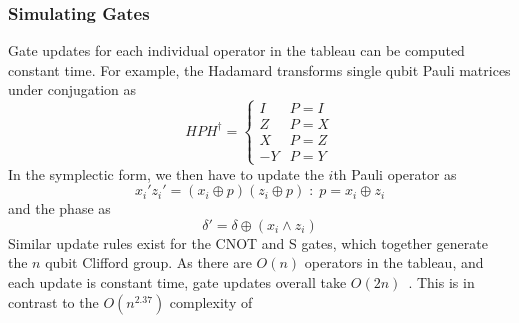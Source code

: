 \subsubsection*{Simulating Gates}
Gate updates for each individual operator in the tableau can be computed constant time. For example, the Hadamard transforms single qubit Pauli matrices under conjugation as
\begin{equation}
    HPH^{\dagger} = \begin{cases}
        I & P=I\\
        Z & P=X\\
        X & P=Z\\
        -Y & P=Y
        \end{cases}
\end{equation}
In the symplectic form, we then have to update the $i$th Pauli operator as
\begin{equation}
    x_{i}'z_{i}' = (x_{i}\oplus p)(z_{i}\oplus p) \; : \; p = x_{i} \oplus z_{i}
\end{equation}
and the phase as
\begin{equation}
\delta' = \delta \oplus \left(x_{i}\wedge z_{i}\right)
\end{equation}
Similar update rules exist for the CNOT and S gates, which together generate the $n$ qubit Clifford group. As there are $O(n)$ operators in the tableau, and each update is constant time, gate updates overall take $O\left(2n\right)$~\cite{Aaronson2004}. This is in contrast to the $O(n^{2.37})$ complexity of~\cite{Dehaene2003}
